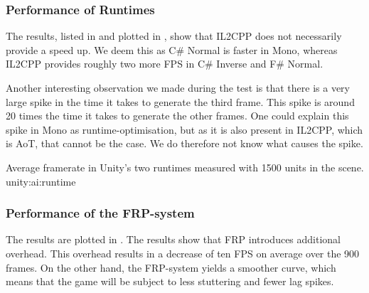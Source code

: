 
\subsubsection{Performance of Runtimes}
The results, listed in  and plotted in , show that IL2CPP does not necessarily provide a speed up. We deem this as C\# Normal is faster in Mono, whereas IL2CPP provides roughly two more \gls{FPS} in C\# Inverse and F\# Normal.

Another interesting observation we made during the test is that there is a very large spike in the time it takes to generate the third frame. This spike is around 20 times the time it takes to generate the other frames. One could explain this spike in Mono as runtime-optimisation, but as it is also present in IL2CPP, which is \gls{AoT}, that cannot be the case. We do therefore not know what causes the spike.

%
{Average framerate in Unity's two runtimes measured with 1500 units in the scene.}%
{unity:ai:runtime}%



\subsubsection{Performance of the FRP-system}
The results are plotted in . The results show that \gls{FRP} introduces additional overhead. This overhead results in a decrease of ten \gls{FPS} on average over the 900 frames. On the other hand, the \gls{FRP}-system yields a smoother curve, which means that the game will be subject to less stuttering and fewer lag spikes.

